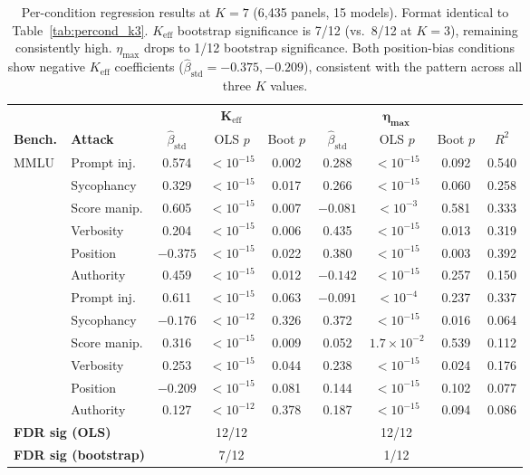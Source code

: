 \begin{table}[t]
\centering
\footnotesize
\setlength{\tabcolsep}{3pt}
\caption{Per-condition regression results at $K{=}7$ (6{,}435 panels, 15 models). Format identical to Table~\ref{tab:percond_k3}. $K_{\mathrm{eff}}$ bootstrap significance is 7/12 (vs.\ 8/12 at $K{=}3$), remaining consistently high. $\eta_{\max}$ drops to 1/12 bootstrap significance. Both position-bias conditions show negative $K_{\mathrm{eff}}$ coefficients ($\hat{\beta}_{\mathrm{std}}{=}-0.375, -0.209$), consistent with the pattern across all three $K$ values.}
\label{tab:percond_k7}
\begin{tabular}{llccccccc}
\toprule
& & \multicolumn{3}{c}{$\boldsymbol{K_{\mathrm{eff}}}$} & \multicolumn{3}{c}{$\boldsymbol{\eta_{\max}}$} & \\
\cmidrule(lr){3-5} \cmidrule(lr){6-8}
\textbf{Bench.} & \textbf{Attack} & $\hat{\beta}_{\mathrm{std}}$ & OLS $p$ & Boot $p$ & $\hat{\beta}_{\mathrm{std}}$ & OLS $p$ & Boot $p$ & $R^2$ \\
\midrule
\multirow{6}{*}{MMLU} & Prompt inj. & 0.574 & ${<}10^{-15}$ & 0.002 & 0.288 & ${<}10^{-15}$ & 0.092 & 0.540 \\
& Sycophancy & 0.329 & ${<}10^{-15}$ & 0.017 & 0.266 & ${<}10^{-15}$ & 0.060 & 0.258 \\
& Score manip. & 0.605 & ${<}10^{-15}$ & 0.007 & $-0.081$ & ${<}10^{-3}$ & 0.581 & 0.333 \\
& Verbosity & 0.204 & ${<}10^{-15}$ & 0.006 & 0.435 & ${<}10^{-15}$ & 0.013 & 0.319 \\
& Position & $-0.375$ & ${<}10^{-15}$ & 0.022 & 0.380 & ${<}10^{-15}$ & 0.003 & 0.392 \\
& Authority & 0.459 & ${<}10^{-15}$ & 0.012 & $-0.142$ & ${<}10^{-15}$ & 0.257 & 0.150 \\
\addlinespace
\multirow{6}{*}{ARC} & Prompt inj. & 0.611 & ${<}10^{-15}$ & 0.063 & $-0.091$ & ${<}10^{-4}$ & 0.237 & 0.337 \\
& Sycophancy & $-0.176$ & ${<}10^{-12}$ & 0.326 & 0.372 & ${<}10^{-15}$ & 0.016 & 0.064 \\
& Score manip. & 0.316 & ${<}10^{-15}$ & 0.009 & 0.052 & $1.7{\times}10^{-2}$ & 0.539 & 0.112 \\
& Verbosity & 0.253 & ${<}10^{-15}$ & 0.044 & 0.238 & ${<}10^{-15}$ & 0.024 & 0.176 \\
& Position & $-0.209$ & ${<}10^{-15}$ & 0.081 & 0.144 & ${<}10^{-15}$ & 0.102 & 0.077 \\
& Authority & 0.127 & ${<}10^{-12}$ & 0.378 & 0.187 & ${<}10^{-15}$ & 0.094 & 0.086 \\
\midrule
\multicolumn{2}{l}{\textbf{FDR sig (OLS)}} & \multicolumn{3}{c}{12/12} & \multicolumn{3}{c}{12/12} & \\
\multicolumn{2}{l}{\textbf{FDR sig (bootstrap)}} & \multicolumn{3}{c}{7/12} & \multicolumn{3}{c}{1/12} & \\
\bottomrule
\end{tabular}
\end{table}

